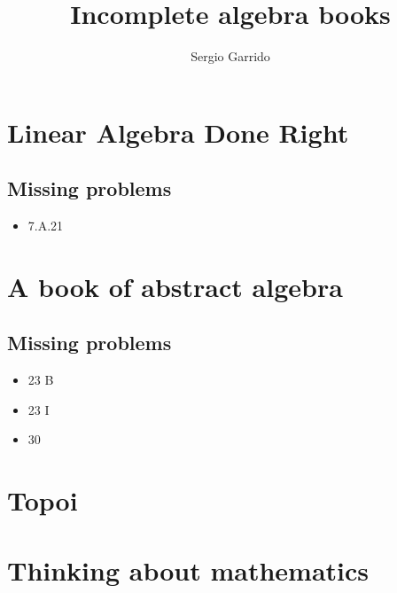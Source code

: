 \documentclass{bookSolutions}
\title{Incomplete algebra books}
\author{Sergio Garrido}
\begin{document}
\tableofcontents
\newpage

\section{Linear Algebra Done Right}
\subsection{Missing problems}
\begin{itemize}
    \item 7.A.21
\end{itemize}


















\newpage
\section{A book of abstract algebra}
\subsection{Missing problems}
\begin{itemize}
    \item 23 B
    \item 23 I
    \item 30
\end{itemize}


















\newpage
\section{Topoi}


\newpage
\section{Thinking about mathematics}

\end{document}
